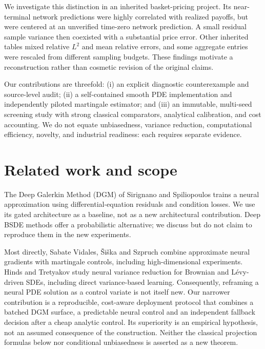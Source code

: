 \documentclass[10pt]{article}
\newcommand{\citep}[1]{\cite{#1}}
\begin{document}
We investigate this distinction in an inherited basket-pricing project. Its
near-terminal network predictions were highly correlated with realized payoffs,
but were centered at an unverified time-zero network prediction. A small residual
sample variance then coexisted with a substantial price error. Other inherited
tables mixed relative $L^2$ and mean relative errors, and some aggregate entries
were rescaled from different sampling budgets. These findings motivate a
reconstruction rather than cosmetic revision of the original claims.

Our contributions are threefold: (i) an explicit diagnostic counterexample and
source-level audit; (ii) a self-contained smooth PDE implementation and
independently piloted martingale estimator; and (iii) an immutable, multi-seed
screening study with strong classical comparators, analytical calibration, and
cost accounting. We do not equate unbiasedness, variance reduction, computational
efficiency, novelty, and industrial readiness: each requires separate evidence.

\section{Related work and scope}
The Deep Galerkin Method (DGM) of Sirignano and Spiliopoulos
\citep{sirignano2018} trains a neural approximation using differential-equation
residuals and condition losses. We use its gated architecture as a baseline,
not as a new architectural contribution. Deep BSDE methods
\citep{han2018} offer a probabilistic alternative; we discuss but do not claim
to reproduce them in the new experiments.

Most directly, Sabate Vidales, \v{S}i\v{s}ka and Szpruch
\citep{vidales2022} combine approximate neural gradients with martingale
controls, including high-dimensional experiments. Hinds and Tretyakov
\citep{hinds2023} study neural variance reduction for Brownian and
L\'evy-driven SDEs, including direct variance-based learning. Consequently,
reframing a neural PDE solution as a control variate is not itself new.
Our narrower contribution is a reproducible, cost-aware deployment protocol that
combines a batched DGM surface, a predictable neural control and an independent
fallback decision after a cheap analytic control. Its superiority is an empirical
hypothesis, not an assumed consequence of the construction.
Neither the classical projection formulas below nor conditional unbiasedness
is asserted as a new theorem.
\end{document}
